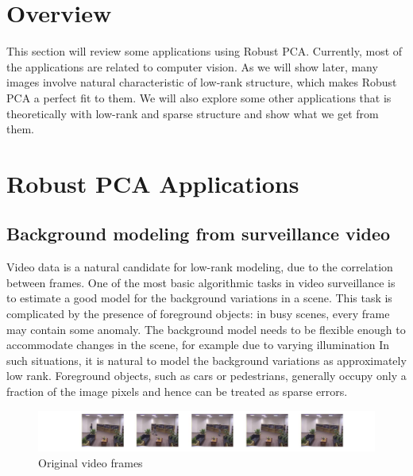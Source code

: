 


\section{Overview}

This section will review some applications using Robust PCA. Currently, most of the applications are related to computer vision. As we will show later, many images involve natural characteristic of low-rank structure, which makes Robust PCA a perfect fit to them. We will also explore some other applications that is theoretically with low-rank and sparse structure and show what we get from them. 

\section{Robust PCA Applications}

\subsection{Background modeling from surveillance video}

Video data is a natural candidate for low-rank modeling, due to the correlation between frames. One of the most basic algorithmic tasks in video surveillance is to estimate a good model for the background variations in a scene. This task is complicated by the presence of foreground objects: in busy scenes, every frame may contain some anomaly. The background model needs to be flexible enough to accommodate changes in the scene, for example due to varying illumination In such situations, it is natural to model the background variations as approximately low rank. Foreground objects, such as cars or pedestrians, generally occupy only a fraction of the image pixels and hence can be treated as sparse errors.

\begin{figure}[h]
  \centering
  \includegraphics[width=1\textwidth]{../figures/SwitchLight_original.pdf}
  \caption{Original video frames}
  \label{fig:video:original}
\end{figure}

